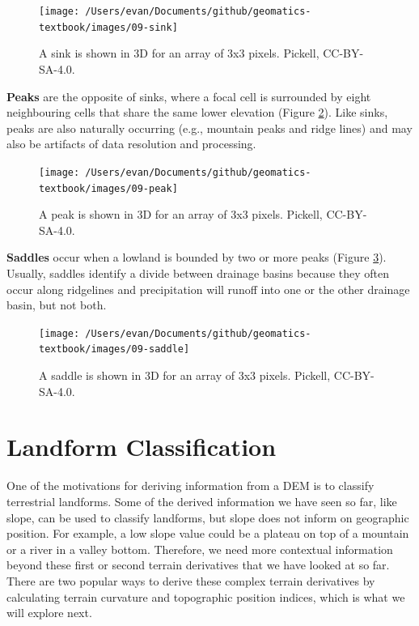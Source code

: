 \documentclass[
]{book}
\begin{document}
\begin{figure}
\texttt{[image: /Users/evan/Documents/github/geomatics-textbook/images/09-sink]} \caption{A sink is shown in 3D for an array of 3x3 pixels. Pickell, CC-BY-SA-4.0.}\label{fig:9-sink}
\end{figure}

\textbf{Peaks} are the opposite of sinks, where a focal cell is surrounded by eight neighbouring cells that share the same lower elevation (Figure \ref{fig:9-peak}). Like sinks, peaks are also naturally occurring (e.g., mountain peaks and ridge lines) and may also be artifacts of data resolution and processing.

\begin{figure}
\texttt{[image: /Users/evan/Documents/github/geomatics-textbook/images/09-peak]} \caption{A peak is shown in 3D for an array of 3x3 pixels. Pickell, CC-BY-SA-4.0.}\label{fig:9-peak}
\end{figure}

\textbf{Saddles} occur when a lowland is bounded by two or more peaks (Figure \ref{fig:9-saddle}). Usually, saddles identify a divide between drainage basins because they often occur along ridgelines and precipitation will runoff into one or the other drainage basin, but not both.

\begin{figure}
\texttt{[image: /Users/evan/Documents/github/geomatics-textbook/images/09-saddle]} \caption{A saddle is shown in 3D for an array of 3x3 pixels. Pickell, CC-BY-SA-4.0.}\label{fig:9-saddle}
\end{figure}

\hypertarget{landform-classification}{%
\section{Landform Classification}\label{landform-classification}}

One of the motivations for deriving information from a DEM is to classify terrestrial landforms. Some of the derived information we have seen so far, like slope, can be used to classify landforms, but slope does not inform on geographic position. For example, a low slope value could be a plateau on top of a mountain or a river in a valley bottom. Therefore, we need more contextual information beyond these first or second terrain derivatives that we have looked at so far. There are two popular ways to derive these complex terrain derivatives by calculating terrain curvature and topographic position indices, which is what we will explore next.
\end{document}
